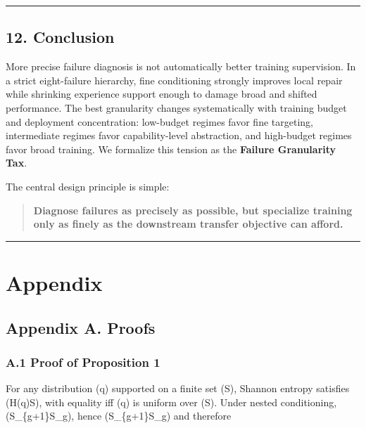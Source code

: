 \documentclass[
]{article}
\begin{document}
\begin{center}\rule{0.5\linewidth}{0.5pt}\end{center}

\subsection{12. Conclusion}\label{conclusion}

More precise failure diagnosis is not automatically better training
supervision. In a strict eight-failure hierarchy, fine conditioning
strongly improves local repair while shrinking experience support enough
to damage broad and shifted performance. The best granularity changes
systematically with training budget and deployment concentration:
low-budget regimes favor fine targeting, intermediate regimes favor
capability-level abstraction, and high-budget regimes favor broad
training. We formalize this tension as the \textbf{Failure Granularity
Tax}.

The central design principle is simple:

\begin{quote}
\textbf{Diagnose failures as precisely as possible, but specialize
training only as finely as the downstream transfer objective can
afford.}
\end{quote}

\begin{center}\rule{0.5\linewidth}{0.5pt}\end{center}

\section{Appendix}\label{appendix}

\subsection{Appendix A. Proofs}\label{appendix-a.-proofs}

\subsubsection{A.1 Proof of Proposition
1}\label{a.1-proof-of-proposition-1}

For any distribution (q) supported on a finite set (S), Shannon entropy
satisfies (H(q)\le \log \textbar S\textbar), with equality iff (q) is
uniform over (S). Under nested conditioning, (S\_\{g+1\}\subseteq S\_g),
hence (\textbar S\_\{g+1\}\textbar{}\le \textbar S\_g\textbar) and
therefore
\end{document}
